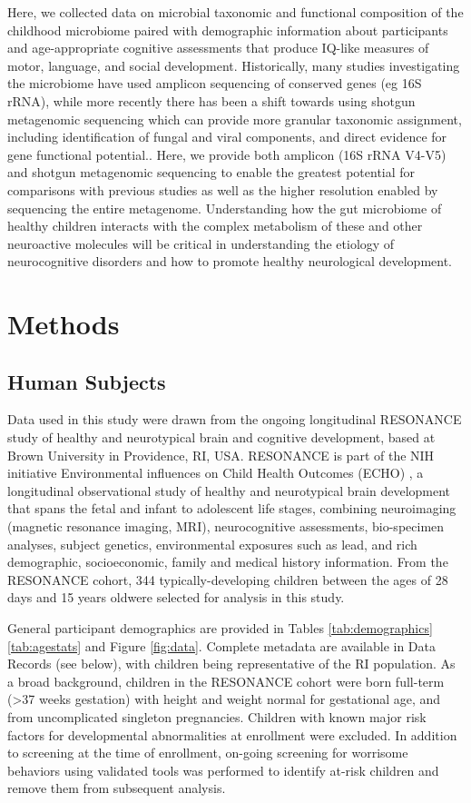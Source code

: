 \documentclass[fleqn,10pt]{wlscirep}
\begin{document}
Here, we collected data on microbial taxonomic and functional composition
of the childhood microbiome paired with demographic information about participants
and age-appropriate cognitive assessments that produce IQ-like measures of motor, language, and social development.
Historically, many studies investigating the microbiome have used amplicon sequencing of conserved genes (eg 16S rRNA),
while more recently there has been a shift towards using shotgun metagenomic sequencing
which can provide more granular taxonomic assignment, including identification of fungal and viral components,
and direct evidence for gene functional potential..
Here, we provide both amplicon (16S rRNA V4-V5) and shotgun metagenomic sequencing
to enable the greatest potential for comparisons with previous studies
as well as the higher resolution enabled by sequencing the entire metagenome.
Understanding how the gut microbiome of healthy children
interacts with the complex metabolism of these and other neuroactive molecules
will be critical in understanding the etiology of neurocognitive disorders
and how to promote healthy neurological development.



\section*{Methods}

\subsection*{Human Subjects}

Data used in this study were drawn from the ongoing longitudinal RESONANCE study
of healthy and neurotypical brain and cognitive development,
based at Brown University in Providence, RI, USA.
RESONANCE is part of the NIH initiative Environmental influences on Child Health Outcomes (ECHO) \cite{Forrest2018-ud,Gillman2018-om},
a longitudinal observational study of healthy and neurotypical brain development
that spans the fetal and infant to adolescent life stages,
combining neuroimaging (magnetic resonance imaging, MRI), neurocognitive assessments, bio-specimen analyses, subject genetics,
environmental exposures such as lead, and rich demographic, socioeconomic, family and medical history information.
From the RESONANCE cohort, 344 typically-developing children
between the ages of 28 days and 15 years oldwere selected for analysis in this study. 

General participant demographics are provided in Tables \ref{tab:demographics} \ref{tab:agestats} and Figure \ref{fig:data}.
Complete metadata are available in Data Records (see below), with children being representative of the RI population.
As a broad background, children in the RESONANCE cohort were born full-term (>37 weeks gestation)
with height and weight normal for gestational age, and from uncomplicated singleton pregnancies.
Children with known major risk factors for developmental abnormalities at enrollment were excluded.
In addition to screening at the time of enrollment,
on-going screening for worrisome behaviors using validated tools was performed
to identify at-risk children and remove them from subsequent analysis.
\end{document}
